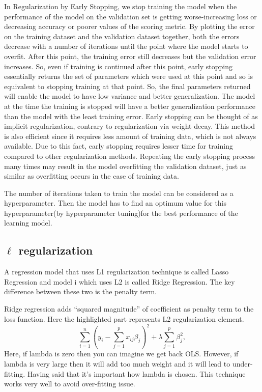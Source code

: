 In Regularization by Early Stopping, we stop training the model when the performance of the 
model on the validation set is getting worse-increasing loss or decreasing accuracy or poorer 
values of the scoring metric. By plotting the error on the training dataset and the validation 
dataset together, both the errors decrease with a number of iterations until the point where 
the model starts to overfit.
After this point, the training error still decreases but the validation error increases. 
So, even if training is continued after this point, early stopping essentially returns the set of
parameters which were used at this point and so is equivalent to stopping training at that point.
So, the final parameters returned will enable the model to have low variance and 
better generalization. 
The model at the time the training is stopped will have a better generalization performance than
the model with the least training error. 
Early stopping can be thought of as implicit regularization, contrary to regularization via 
weight decay. 
This method is also efficient since it requires less amount of training data,
which is not always available. Due to this fact, early stopping requires lesser time for training 
compared to other regularization methods. 
Repeating the early stopping process many times may result in the model overfitting the
validation dataset, just as similar as overfitting occurs in the case of training data.

The number of iterations taken to train the model can be considered as a hyperparameter.
Then the model has to find an optimum value for this hyperparameter(by hyperparameter 
tuning)for the best performance of the learning model.


\subsection{$\ell$ regularization}
A regression model that uses L1 regularization technique is called Lasso Regression and model i
which uses L2 is called Ridge Regression.
The key difference between these two is the penalty term.

Ridge regression adds ``squared magnitude'' of coefficient as penalty term to the loss function.
Here the highlighted part represents L2 regularization element.
\begin{equation}
	\label{equ:ridge_regression}
	\sum_{i=1}^{n}(y_{i}-\sum_{j=1}^{p}x_{ij}\beta_{j})^{2} + \lambda \sum_{j=1}^{p}\beta_{j}^{2},
\end{equation}
Here, if lambda is zero then you can imagine we get back OLS.
However, if lambda is very large then it will add too much weight and it will lead to
under-fitting. Having said that it’s important how lambda is chosen.
This technique works very well to avoid over-fitting issue.


